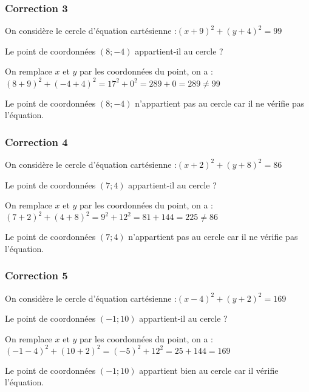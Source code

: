 \documentclass[15pt, mathserif]{beamer}
\begin{document}
\begin{frame}
\vspace{-10mm}
	\frametitle{Correction 3}
On considère le cercle d'équation cartésienne :$(x+9)^2+(y+4)^2 =99$ 
 
 Le point de coordonnées $(8;-4)$ appartient-il au cercle ? 
 
 \bigskip 
 On remplace $x$ et $y$ par les coordonnées du point, on a : $(8+9)^2+(-4+4)^2 =17^2+0^2=289+0=289\neq 99$ 
 
 Le point de coordonnées $(8;-4)$ n'appartient pas au cercle car il ne vérifie pas l'équation. \end{frame}


\begin{frame}
\vspace{-10mm}
	\frametitle{Correction 4}
On considère le cercle d'équation cartésienne :$(x+2)^2+(y+8)^2 =86$ 
 
 Le point de coordonnées $(7;4)$ appartient-il au cercle ? 
 
 \bigskip 
 On remplace $x$ et $y$ par les coordonnées du point, on a : $(7+2)^2+(4+8)^2 =9^2+12^2=81+144=225\neq 86$ 
 
 Le point de coordonnées $(7;4)$ n'appartient pas au cercle car il ne vérifie pas l'équation. \end{frame}


\begin{frame}
\vspace{-10mm}
	\frametitle{Correction 5}
On considère le cercle d'équation cartésienne :$(x-4)^2+(y+2)^2 =169$ 
 
 Le point de coordonnées $(-1;10)$ appartient-il au cercle ? 
 
 \bigskip 
 On remplace $x$ et $y$ par les coordonnées du point, on a : $(-1-4)^2+(10+2)^2 =\left(-5\right)^2+12^2=25+144=169$ 
 
 Le point de coordonnées $(-1;10)$ appartient bien au cercle car il vérifie l'équation. \end{frame}
\end{document}
